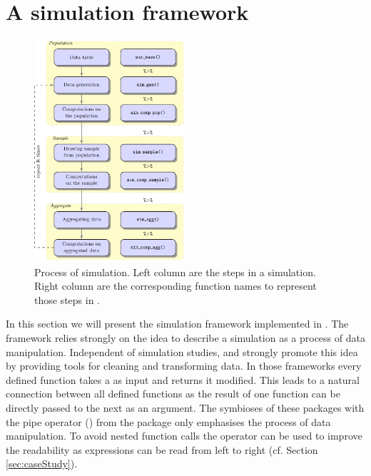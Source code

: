 \documentclass[article]{ajs}
\begin{document}
\section{A simulation framework}
\label{sec:framework}
%
\begin{figure}
\begin{center}
\includegraphics[width=0.5\textwidth]{flowdiagram}
\end{center}
\caption{\label{fig:flowdiagram}Process of simulation. Left column are the steps in a simulation. Right column are the corresponding function names to represent those steps in .} 
\end{figure}
%
In this section we will present the simulation framework implemented in . The framework relies strongly on the idea to describe a simulation as a process of data manipulation. Independent of simulation studies, \cite{wickham14a} and \cite{wickham14b} strongly promote this idea by providing tools for cleaning and transforming data. In those frameworks every defined function takes a  as input and returns it modified. This leads to a natural connection between all defined functions as the result of one function can be directly passed to the next as an argument. The symbioses of these packages with the pipe operator (\proglang{\%>\%}) from the package  \citep{bache14} only emphasises the process of data manipulation. To avoid nested function calls the operator can be used to improve the readability as expressions can be read from left to right (cf. Section \ref{sec:caseStudy}).
\end{document}

